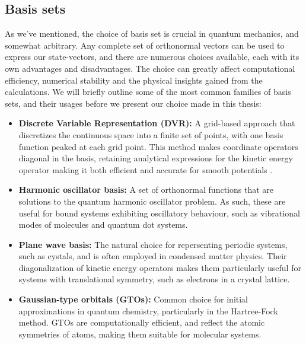 \documentclass{subfiles}
\begin{document}
\subsection{Basis sets}\label{sec:basis_set}
As we've mentioned, the choice of basis set is crucial in quantum mechanics, and somewhat arbitrary. Any complete set of orthonormal vectors can be used to express our state-vectors, and there are numerous choices available, each with its own advantages and disadvantages. The choice can greatly affect computational efficiency, numerical stability and the physical insights gained from the calculations. We will briefly outline some of the most common families of basis sets, and their usages before we present our choice made in this thesis:
\begin{itemize}
    \item \textbf{Discrete Variable Representation (DVR):} A grid-based approach that discretizes the continuous space into a finite set of points, with one basis function peaked at each grid point. This method makes coordinate operators diagonal in the basis, retaining analytical expressions for the kinetic energy operator making it both efficient and accurate for smooth potentials \cite{light1985generalized}. 
    \item \textbf{Harmonic oscillator basis:} A set of orthonormal functions that are solutions to the quantum harmonic oscillator problem. As such, these are useful for bound systems exhibiting oscillatory behaviour, such as vibrational modes of molecules and quantum dot systems.
    \item \textbf{Plane wave basis:} The natural choice for repersenting periodic systems, such as cystals, and is often employed in condensed matter physics. Their diagonalization of kinetic energy operators makes them particularly useful for systems with translational symmetry, such as electrons in a crystal lattice. \cite{kittel2018introduction}
    \item \textbf{Gaussian-type orbitals (GTOs):} Common choice for initial approximations in quantum chemistry, particularly in the Hartree-Fock method. GTOs are computationally efficient, and reflect the atomic symmetries of atoms, making them suitable for molecular systems. \cite{szabo1996modern}
\end{itemize}
\end{document}
